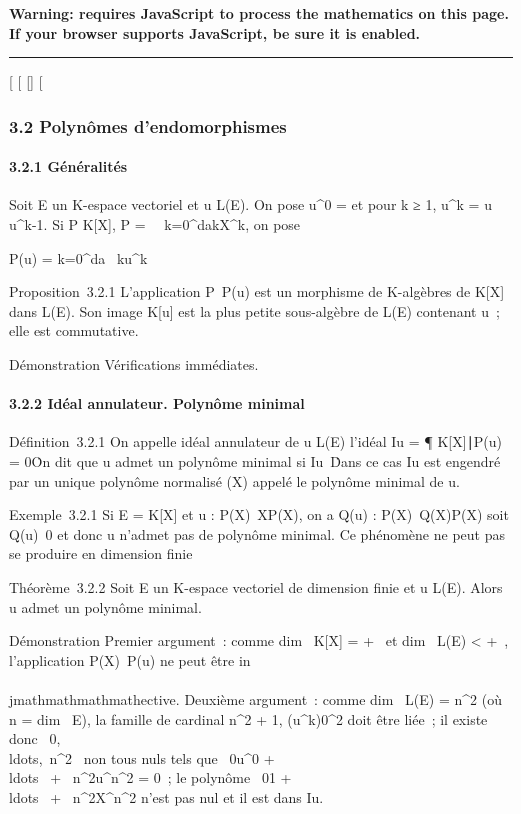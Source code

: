 \textbf{Warning: 
requires JavaScript to process the mathematics on this page.\\ If your
browser supports JavaScript, be sure it is enabled.}

\begin{center}\rule{3in}{0.4pt}\end{center}

{[}
{[}
{[}{]}
{[}

\subsubsection{3.2 Polynômes d'endomorphismes}

\paragraph{3.2.1 Généralités}

Soit E un K-espace vectoriel et u \in L(E). On pose u^0 =
\mathrmIdE et pour k ≥ 1, u^k = u
\cdot u^k-1. Si P \in K{[}X{]}, P =\
\sum ~
k=0^dakX^k, on pose

P(u) = \sum k=0^da~
ku^k

Proposition~3.2.1 L'application P\mapsto~P(u) est un
morphisme de K-algèbres de K{[}X{]} dans L(E). Son image K{[}u{]} est la
plus petite sous-algèbre de L(E) contenant u~; elle est commutative.

Démonstration Vérifications immédiates.

\paragraph{3.2.2 Idéal annulateur. Polynôme minimal}

Définition~3.2.1 On appelle idéal annulateur de u \in L(E) l'idéal
Iu = \P \in
K{[}X{]}∣P(u) = 0\. On dit
que u admet un polynôme minimal si
Iu\neq~\0\.
Dans ce cas Iu est engendré par un unique polynôme normalisé
\muu(X) appelé le polynôme minimal de u.

Exemple~3.2.1 Si E = K{[}X{]} et u :
P(X)\mapsto~XP(X), on a Q(u) :
P(X)\mapsto~Q(X)P(X) soit
Q(u)\neq~0 et donc u n'admet pas de polynôme
minimal. Ce phénomène ne peut pas se produire en dimension finie

Théorème~3.2.2 Soit E un K-espace vectoriel de dimension finie et u \in
L(E). Alors u admet un polynôme minimal.

Démonstration Premier argument~: comme dim~
K{[}X{]} = +\infty~ et dim~ L(E) \textless{} +\infty~,
l'application P(X)\mapsto~P(u) ne peut être
in\\\\jmathmathmathmathective. Deuxième argument~: comme dim~ L(E)
= n^2 (où n = dim~ E), la famille de
cardinal n^2 + 1,
(u^k)0\leqk\leqn^2 doit être liée~; il existe
donc
\lambda~0,\\ldots,\lambda~n^2~
non tous nuls tels que \lambda~0u^0 +
\\ldots~ +
\lambda~n^2u^n^2  = 0~; le polynôme
\lambda~01 +
\\ldots~ +
\lambda~n^2X^n^2  n'est pas nul et
il est dans Iu.

